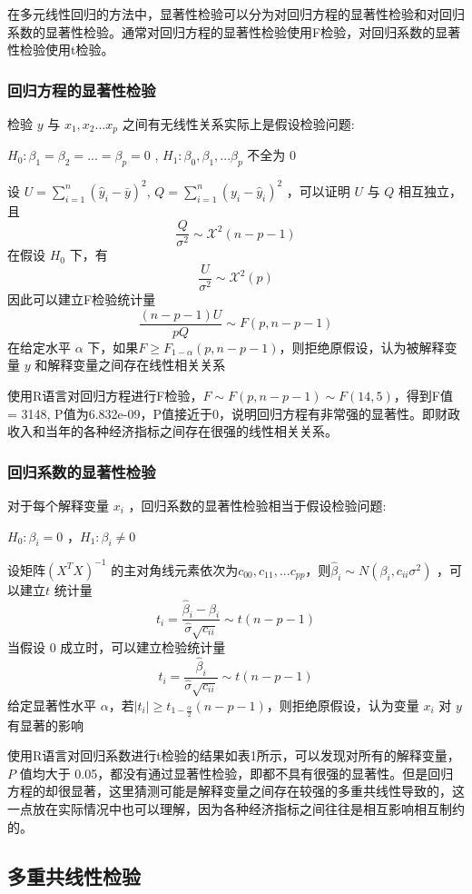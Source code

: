 \documentclass [a4paper]{article}
\begin{document}
在多元线性回归的方法中，显著性检验可以分为对回归方程的显著性检验和对回归系数的显著性检验。通常对回归方程的显著性检验使用F检验，对回归系数的显著性检验使用t检验。

\subsubsection{回归方程的显著性检验}

检验 $y$ 与 $x_1,x_2...x_p$ 之间有无线性关系实际上是假设检验问题:

$H_0:\beta_1= \beta_2 =...=\beta_p=0$ , $H_1:\beta_0,\beta_1,...\beta_p$ 不全为 0

设 $U = \sum_{i=1}^n(\hat y_i -\bar y)^2$, $Q=\sum_{i=1}^n(y_i-\hat y_i)^2$ ，可以证明 $U$ 与 $Q$ 相互独立，且
$$
\frac{Q}{\sigma^2} \sim \mathcal{X}^2(n-p-1)
$$
 在假设 $H_0$ 下，有
$$
\frac{U}{\sigma^2} \sim \mathcal{X}^2(p)
$$
因此可以建立F检验统计量
$$
\frac{(n-p-1)U}{pQ} \sim F(p,n-p-1)
$$
在给定水平 $\alpha$ 下，如果$F \ge F_{1-\alpha} (p,n-p-1)$，则拒绝原假设，认为被解释变量 $y$ 和解释变量之间存在线性相关关系

使用R语言对回归方程进行F检验，$F \sim F(p,n-p-1) \sim F(14,5)$，得到F值 =  3148, P值为6.832e-09，P值接近于0，说明回归方程有非常强的显著性。即财政收入和当年的各种经济指标之间存在很强的线性相关关系。
\subsubsection{回归系数的显著性检验}

对于每个解释变量 $x_i$ ，回归系数的显著性检验相当于假设检验问题:

$H_0: \beta_i=0$ ，$H_1:\beta_i \ne 0$

设矩阵$(X^TX)^{-1}$ 的主对角线元素依次为$c_{00},c_{11},...c_{pp}$，则$\hat \beta_i \sim N(\beta_i,c_{ii}\sigma^2)$ ，可以建立$t$ 统计量
$$
t_i =\frac{\hat \beta_i - \beta_i}{\hat \sigma \sqrt{c_{ii}}} \sim t(n-p-1)
$$
 当假设 0 成立时，可以建立检验统计量
$$
t_i = \frac{\hat \beta_i}{\hat \sigma \sqrt{c_{ii}}} \sim t(n-p-1)
$$
给定显著性水平 $\alpha $，若$|t_i| \ge t_{1-\frac{\alpha}{2}}(n-p-1)$，则拒绝原假设，认为变量 $x_i$ 对 $y$ 有显著的影响

使用R语言对回归系数进行t检验的结果如表1所示，可以发现对所有的解释变量，$P$ 值均大于 0.05，都没有通过显著性检验，即都不具有很强的显著性。但是回归方程的却很显著，这里猜测可能是解释变量之间存在较强的多重共线性导致的，这一点放在实际情况中也可以理解，因为各种经济指标之间往往是相互影响相互制约的。

\subsection{多重共线性检验}
\end{document}
